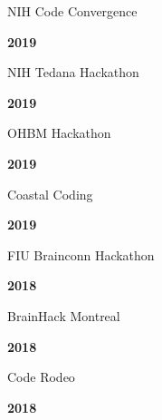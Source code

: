 \documentclass[10pt]{article}
\begin{document}
\begin{minipage}[t]{.85\linewidth}
	\flushleft
	\noindent
	NIH Code Convergence
	\end{minipage}
	\hfill
	\begin{minipage}[t]{.15\linewidth}
	\flushright
	\noindent
	\textsc{\textbf{2019}}
\end{minipage}

\begin{minipage}[t]{.85\linewidth}
	\flushleft
	\noindent
	NIH Tedana Hackathon
	\end{minipage}
	\hfill
	\begin{minipage}[t]{.15\linewidth}
	\flushright
	\noindent
	\textsc{\textbf{2019}}
\end{minipage}

\begin{minipage}[t]{.85\linewidth}
	\flushleft
	\noindent
	OHBM Hackathon
	\end{minipage}
	\hfill
	\begin{minipage}[t]{.15\linewidth}
	\flushright
	\noindent
	\textsc{\textbf{2019}}
\end{minipage}

\begin{minipage}[t]{.85\linewidth}
	\flushleft
	\noindent
	Coastal Coding
	\end{minipage}
	\hfill
	\begin{minipage}[t]{.15\linewidth}
	\flushright
	\noindent
	\textsc{\textbf{2019}}
\end{minipage}

\begin{minipage}[t]{.85\linewidth}
	\flushleft
	\noindent
	FIU Brainconn Hackathon
	\end{minipage}
	\hfill
	\begin{minipage}[t]{.15\linewidth}
	\flushright
	\noindent
	\textsc{\textbf{2018}}
\end{minipage}

\begin{minipage}[t]{.85\linewidth}
	\flushleft
	\noindent
	BrainHack Montreal
	\end{minipage}
	\hfill
	\begin{minipage}[t]{.15\linewidth}
	\flushright
	\noindent
	\textsc{\textbf{2018}}
\end{minipage}

\begin{minipage}[t]{.85\linewidth}
	\flushleft
	\noindent
	Code Rodeo
	\end{minipage}
	\hfill
	\begin{minipage}[t]{.15\linewidth}
	\flushright
	\noindent
	\textsc{\textbf{2018}}
\end{minipage}
\end{document}
